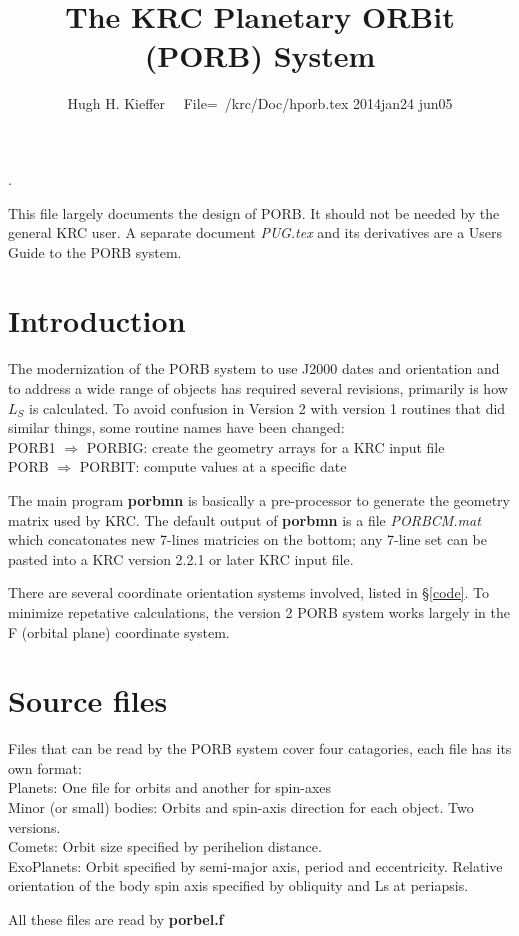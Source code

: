 \documentclass[draft]{article}
\title{The KRC Planetary ORBit (PORB) System}
\author{Hugh H. Kieffer  \ \ File=~/krc/Doc/hporb.tex 2014jan24 jun05}
\newcommand{\qi}{\\ \hspace*{2.em}}      %
\newcommand{\np}{\textbf}  %
\newcommand{\nf}{\textit}  %
\begin{document}
\maketitle
\tableofcontents
\hrulefill .\hrulefill

This file largely documents the design of PORB. It should not be needed by
the general KRC user. A separate document \nf{PUG.tex} and its derivatives are a
Users Guide to the PORB system.



\section{Introduction} The modernization of the PORB system to use J2000 dates and orientation and to address a wide range of objects has required several revisions, primarily is how $L_S$ is calculated. To avoid confusion in Version 2 with version 1 routines that did similar things, some routine names have been changed:
\qi PORB1 $\Rightarrow$ PORBIG: create the geometry arrays for a KRC input file 
\qi PORB $\Rightarrow$ PORBIT: compute values at a specific date 

The main program \np{porbmn} is basically a pre-processor to generate the
geometry matrix used by KRC. The default output of \np{porbmn} is a file
\nf{PORBCM.mat} which concatonates new 7-lines matricies on the bottom; any
7-line set can be pasted into a KRC version 2.2.1 or later KRC input file.

There are several coordinate orientation systems involved, listed in \S \ref{code}. To minimize repetative calculations, the version 2 PORB system works largely in the F (orbital plane) coordinate system. 

\section{Source files} %
Files that can be read by the PORB system cover four catagories, each file has its own format:
\qi Planets:  One file for orbits and another for spin-axes
\qi Minor (or small) bodies: Orbits and spin-axis direction for each object. Two versions.
\qi Comets: Orbit size specified by perihelion distance. 
\qi ExoPlanets: Orbit specified by semi-major axis, period and eccentricity. Relative orientation of the body spin axis specified by obliquity and Ls at periapsis.

All these files are read by \np{porbel.f} 
\end{document}
